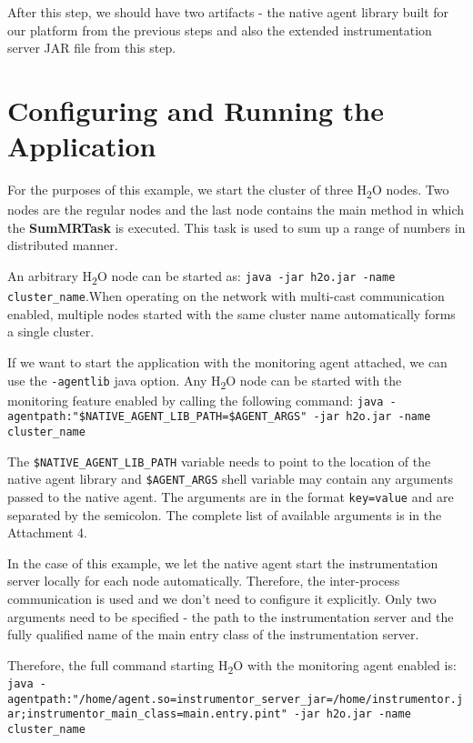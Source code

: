 After this step, we should have two artifacts - the native agent library built for our platform from the previous steps and also the extended instrumentation server JAR file from this step.
\section{Configuring and Running the Application}
For the purposes of this example, we start the cluster of three H\textsubscript{2}O nodes. Two nodes are the regular nodes and the last node contains the main method in which the \textbf{SumMRTask} is executed. This task is used to sum up a range of numbers in distributed manner.

An arbitrary H\textsubscript{2}O node can be started as: \newline \texttt{java -jar h2o.jar -name cluster\_name}.\newline When operating on the network with multi-cast communication enabled, multiple nodes started with the same cluster name automatically forms a single cluster.

If we want to start the application with the monitoring agent attached, we can use the \texttt{-agentlib} java option. Any H\textsubscript{2}O node can be started with the monitoring feature enabled by calling the following command: \newline
\texttt{java -agentpath:"\$NATIVE\_AGENT\_LIB\_PATH=\$AGENT\_ARGS" -jar h2o.jar  \newline -name cluster\_name}

The \texttt{\$NATIVE\_AGENT\_LIB\_PATH} variable needs to point to the location of the native agent library and \texttt{\$AGENT\_ARGS} shell variable may contain any arguments passed to the native agent. The arguments are in the format \texttt{key=value} and are separated by the semicolon. The complete list of available arguments is in the Attachment 4.

In the case of this example, we let the native agent start the instrumentation server locally for each node automatically. Therefore, the inter-process communication is used and we don't need to configure it explicitly. Only two arguments need to be specified - the path to the instrumentation server and the fully qualified name of the main entry class of the instrumentation server.

Therefore, the full command starting H\textsubscript{2}O with the monitoring agent enabled is: \newline
\texttt{java -agentpath:"/home/agent.so=instrumentor\_server\_jar=\newline/home/instrumentor.jar;instrumentor\_main\_class=main.entry.pint" \newline-jar h2o.jar -name cluster\_name}

